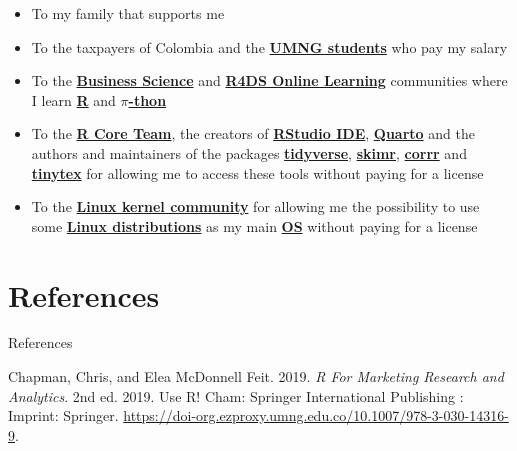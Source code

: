 \documentclass[
  ignorenonframetext,
]{beamer}
\newlength{\cslhangindent}
\newenvironment{CSLReferences}[2] %
 {\begin{list}{}{%
  \setlength{\itemindent}{0pt}
  \setlength{\leftmargin}{0pt}
  \setlength{\parsep}{0pt}
  \ifodd #1
   \setlength{\leftmargin}{\cslhangindent}
   \setlength{\itemindent}{-1\cslhangindent}
  \fi
  \setlength{\itemsep}{#2\baselineskip}}}
 {\end{list}}
\begin{document}
\begin{frame}{}
\label{section-28}
\begin{itemize}
\item
  To my family that supports me
\item
  To the taxpayers of Colombia and the
  \href{https://www.umng.edu.co/estudiante}{\textbf{UMNG students}} who
  pay my salary
\item
  To the \href{https://www.business-science.io/}{\textbf{Business
  Science}} and \href{https://www.rfordatasci.com/}{\textbf{R4DS Online
  Learning}} communities where I learn
  \href{https://www.r-project.org/about.html}{\textbf{R}} and
  \href{https://www.python.org/about/}{\textbf{\(\pi\)-thon}}
\item
  To the \href{https://www.r-project.org/contributors.html}{\textbf{R
  Core Team}}, the creators of
  \href{https://posit.co/products/open-source/rstudio/}{\textbf{RStudio
  IDE}}, \href{https://quarto.org/}{\textbf{Quarto}} and the authors and
  maintainers of the packages
  \href{https://CRAN.R-project.org/package=tidyverse}{\textbf{tidyverse}},
  \href{https://CRAN.R-project.org/package=skimr}{\textbf{skimr}},
  \href{https://CRAN.R-project.org/package=corrr}{\textbf{corrr}} and
  \href{https://CRAN.R-project.org/package=tinytex}{\textbf{tinytex}}
  for allowing me to access these tools without paying for a license
\item
  To the \href{https://www.kernel.org/category/about.html}{\textbf{Linux
  kernel community}} for allowing me the possibility to use some
  \href{https://static.lwn.net/Distributions/}{\textbf{Linux
  distributions}} as my main
  \href{https://en.wikipedia.org/wiki/Operating_system}{\textbf{OS}}
  without paying for a license
\end{itemize}
\end{frame}

\section*{References}\label{references}

\begin{frame}[allowframebreaks]{References}
\label{refs}
\begin{CSLReferences}{1}{0}
Chapman, Chris, and Elea McDonnell Feit. 2019. \emph{R {For} {Marketing}
{Research} and {Analytics}}. 2nd ed. 2019. Use {R}! Cham: Springer
International Publishing : Imprint: Springer.
\url{https://doi-org.ezproxy.umng.edu.co/10.1007/978-3-030-14316-9}.

\end{CSLReferences}
\end{frame}
\end{document}
